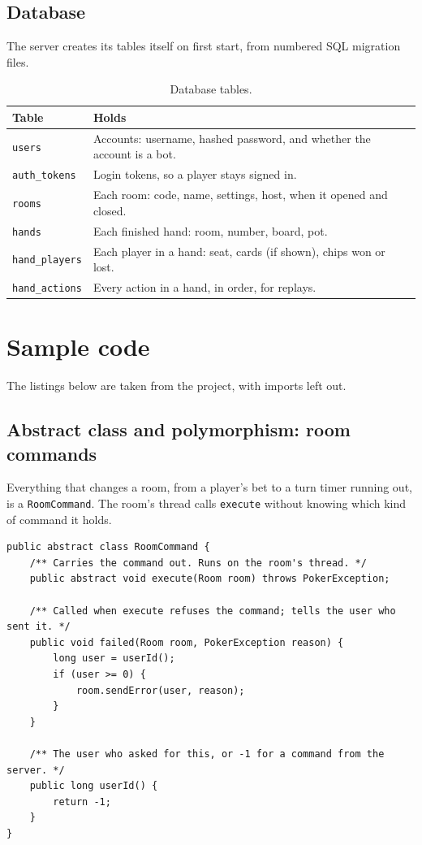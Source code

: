 \documentclass[12pt,a4paper]{article}
\newcommand{\cls}[1]{\texttt{#1}}
\begin{document}
\subsection{Database}
The server creates its tables itself on first start, from numbered SQL migration files.

\begin{table}[H]
\centering\small
\caption{Database tables.}
\begin{tabularx}{\textwidth}{@{}lL@{}}
\toprule
Table & Holds \\
\midrule
\cls{users} & Accounts: username, hashed password, and whether the account is a bot. \\
\cls{auth\_tokens} & Login tokens, so a player stays signed in. \\
\cls{rooms} & Each room: code, name, settings, host, when it opened and closed. \\
\cls{hands} & Each finished hand: room, number, board, pot. \\
\cls{hand\_players} & Each player in a hand: seat, cards (if shown), chips won or lost. \\
\cls{hand\_actions} & Every action in a hand, in order, for replays. \\
\bottomrule
\end{tabularx}
\end{table}

\section{Sample code}

The listings below are taken from the project, with imports left out.

\subsection{Abstract class and polymorphism: room commands}
Everything that changes a room, from a player's bet to a turn timer running out, is a
\cls{RoomCommand}. The room's thread calls \cls{execute} without knowing which kind of command
it holds.

\begin{lstlisting}[caption={\cls{RoomCommand} (poker-server, \cls{server.room}).}]
public abstract class RoomCommand {
    /** Carries the command out. Runs on the room's thread. */
    public abstract void execute(Room room) throws PokerException;

    /** Called when execute refuses the command; tells the user who sent it. */
    public void failed(Room room, PokerException reason) {
        long user = userId();
        if (user >= 0) {
            room.sendError(user, reason);
        }
    }

    /** The user who asked for this, or -1 for a command from the server. */
    public long userId() {
        return -1;
    }
}
\end{lstlisting}
\end{document}
